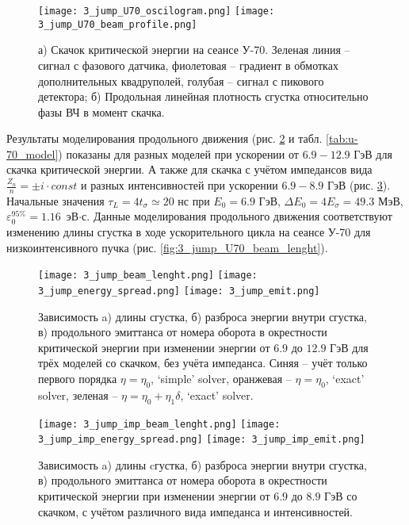 \begin{figure}
   \texttt{[image: 3\_jump\_U70\_oscilogram.png]}
   \texttt{[image: 3\_jump\_U70\_beam\_profile.png]}
   \caption{а) Скачок критической энергии на сеансе У-70. Зеленая линия – сигнал с фазового датчика, фиолетовая – градиент в обмотках дополнительных квадруполей, голубая – сигнал с пикового детектора; б) Продольная линейная плотность сгустка относительно фазы ВЧ в момент скачка.}
   \label{fig:3_jump_U70_oscilogram}
\end{figure}

\par Результаты моделирования продольного движения (рис. \ref{fig:3_jump} и табл. \ref{tab:u-70_model}) показаны для разных моделей при ускорении от $6.9-12.9$ ГэВ для скачка критической энергии. А также для скачка с учётом импедансов вида $\frac{Z_n}{n}=\pm i\cdot const$ и разных интенсивностей при ускорении $6.9-8.9$ ГэВ (рис. \ref{fig:3_jump_imp}). Начальные значения $\tau_L=4t_\sigma\simeq20$ нс при $E_0=6.9$ ГэВ, $\Delta E_{0} = 4E_{\sigma} =49.3$ МэВ, $\varepsilon_{0}^{95\%}=1.16$~эВ$\cdot$с. Данные моделирования продольного движения соответствуют изменению длины сгустка в ходе ускорительного цикла на сеансе У-70 для низкоинтенсивного пучка (рис. \ref{fig:3_jump_U70_beam_lenght}).

\begin{figure}
   \texttt{[image: 3\_jump\_beam\_lenght.png]}
   \texttt{[image: 3\_jump\_energy\_spread.png]}
   \texttt{[image: 3\_jump\_emit.png]}
   \caption{Зависимость a) длины сгустка, б) разброса энергии внутри сгустка, в) продольного эмиттанса от номера оборота в окрестности критической энергии при изменении энергии от $6.9$ до $12.9$ ГэВ для трёх моделей со скачком, без учёта импеданса. Синяя – учёт только первого порядка $\eta=\eta_0$, ‘simple’ solver, оранжевая – $\eta=\eta_0$, ‘exact’ solver, зеленая – $\eta=\eta_0+\eta_1\delta$, ‘exact’ solver.}
   \label{fig:3_jump}
\end{figure}

\begin{figure}
   \texttt{[image: 3\_jump\_imp\_beam\_lenght.png]}
   \texttt{[image: 3\_jump\_imp\_energy\_spread.png]}
   \texttt{[image: 3\_jump\_imp\_emit.png]}
   \caption{Зависимость a) длины cгустка, б) разброса энергии внутри сгустка, в) продольного эмиттанса от номера оборота в окрестности критической энергии при изменении энергии от $6.9$ до $8.9$ ГэВ со скачком, с учётом различного вида импеданса и интенсивностей.}
   \label{fig:3_jump_imp}
\end{figure}

